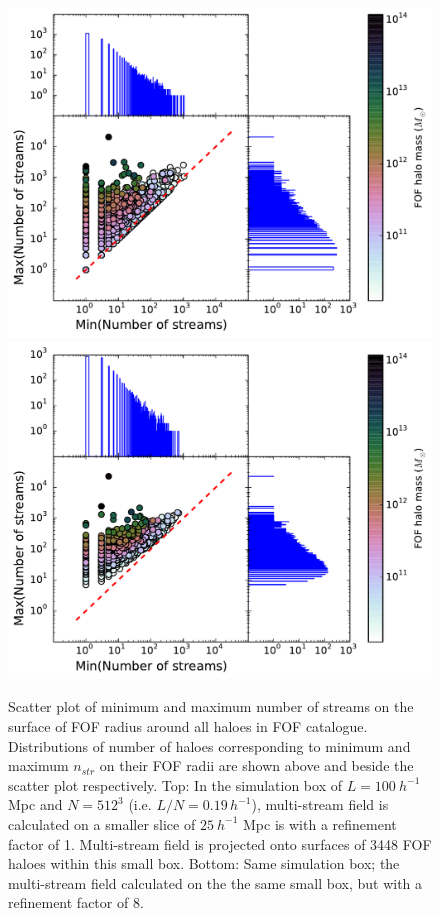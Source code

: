  \begin{figure}
\begin{minipage}[t]{.99\linewidth}
  \centering\includegraphics[width=10.cm]{Chapter3/Source_v2/fig12a}
\includegraphics[width=10.cm]{Chapter3/Source_v2/fig12b} 
\end{minipage}\hfill
\caption{Scatter plot of minimum and maximum number of streams on the surface of FOF radius around all haloes in FOF catalogue. Distributions of number of haloes corresponding to minimum and maximum $n_{str}$ on their FOF radii are shown above and beside the scatter plot respectively. Top: In the simulation box of $L =100 ~h^{-1}$ Mpc and $N = 512^3$ (i.e. $L/N = 0.19 \,h^{-1}$), multi-stream field is calculated on a smaller slice of $ 25 ~h^{-1}$ Mpc is  with a refinement factor of 1. Multi-stream field is projected onto surfaces of 3448 FOF haloes within this small box. Bottom: Same simulation box; the multi-stream field calculated on the the same small box, but with a refinement factor of 8.}
\label{fig:minmax512}
\end{figure}

